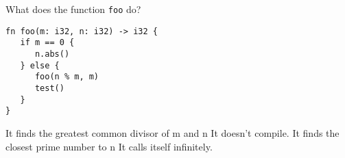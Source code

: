 %
%
What does the function \texttt{foo} do?
\begin{lstlisting}
fn foo(m: i32, n: i32) -> i32 {
   if m == 0 {
      n.abs()
   } else {
      foo(n % m, m)
      test()
   }
}
\end{lstlisting}
  \choice It finds the greatest common divisor of m and n
  \choice It doesn't compile.
  \choice It finds the closest prime number to n
  \choice It calls itself infinitely.

